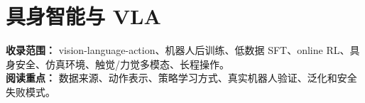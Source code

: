 
\section*{具身智能与 VLA}
{}

\begin{conceptbox}
\textbf{收录范围：} vision-language-action、机器人后训练、低数据 SFT、online RL、具身安全、仿真环境、触觉/力觉多模态、长程操作。\\
\textbf{阅读重点：} 数据来源、动作表示、策略学习方式、真实机器人验证、泛化和安全失败模式。
\end{conceptbox}

